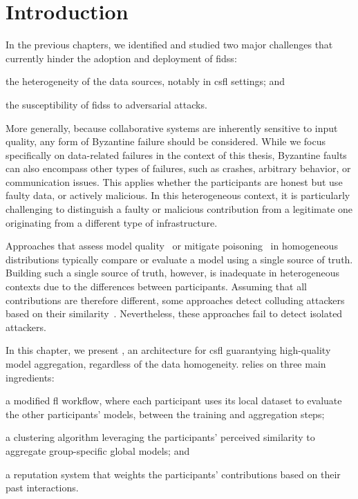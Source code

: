 \section{Introduction\label{sec:radar.intro}}

In the previous chapters, we identified and studied two major challenges that currently hinder the adoption and deployment of \glspl{fids}: \begin{enumerate*}[(1)]
  \item the heterogeneity of the data sources, notably in \gls{csfl} settings; and
  \item the susceptibility of \glspl{fids} to adversarial attacks.
\end{enumerate*}
More generally, because collaborative systems are inherently sensitive to input quality, any form of Byzantine failure should be considered.
While we focus specifically on data-related failures in the context of this thesis, Byzantine faults can also encompass other types of failures, such as crashes, arbitrary behavior, or communication issues.
This applies whether the participants are honest but use faulty data, or actively malicious.
In this heterogeneous context, it is particularly challenging to distinguish a faulty or malicious contribution from a legitimate one originating from a different type of infrastructure.

Approaches that assess model quality~\cite{pejo_QualityInferenceFederated_2023} or mitigate poisoning~\cite{blanchard_Machinelearningadversaries_2017,cao_FLTrustByzantinerobustFederated_2022} in homogeneous distributions typically compare or evaluate a model using a single source of truth.
Building such a single source of truth, however, is inadequate in heterogeneous contexts due to the differences between participants. 
Assuming that all contributions are therefore different, some approaches detect colluding attackers based on their similarity~\cite{fung_LimitationsFederatedLearning_2020,awan_CONTRADefendingPoisoning_2021}. 
Nevertheless, these approaches fail to detect isolated attackers.

In this chapter, we present \thecontrib, an architecture for \gls{csfl} guarantying high-quality model aggregation, regardless of the data homogeneity.
\thecontrib relies on three main ingredients:
\begin{enumerate*}[label=\em {\roman*})]
    \item a modified \gls{fl} workflow, where each participant uses its local dataset to evaluate the other participants' models, between the training and aggregation steps;
    \item a clustering algorithm leveraging the participants' perceived similarity to aggregate group-specific global models; and
    \item a reputation system that weights the participants' contributions based on their past interactions.
\end{enumerate*}

